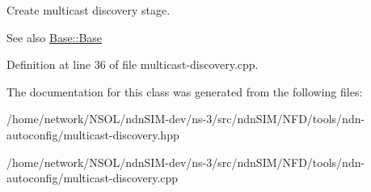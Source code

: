 Create multicast discovery stage. 

\begin{DoxySeeAlso}{See also}
\hyperlink{classndn_1_1tools_1_1autoconfig_1_1Base_a4d378253464c3fde9a499ccafb944153}{Base\+::\+Base} 
\end{DoxySeeAlso}


Definition at line 36 of file multicast-\/discovery.\+cpp.



The documentation for this class was generated from the following files\+:\begin{DoxyCompactItemize}
\item 
/home/network/\+N\+S\+O\+L/ndn\+S\+I\+M-\/dev/ns-\/3/src/ndn\+S\+I\+M/\+N\+F\+D/tools/ndn-\/autoconfig/multicast-\/discovery.\+hpp\item 
/home/network/\+N\+S\+O\+L/ndn\+S\+I\+M-\/dev/ns-\/3/src/ndn\+S\+I\+M/\+N\+F\+D/tools/ndn-\/autoconfig/multicast-\/discovery.\+cpp\end{DoxyCompactItemize}
